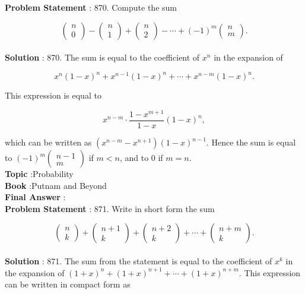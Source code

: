 \documentclass[10pt]{article}
\begin{document}
\textbf{Problem Statement} :
870. Compute the sum

$$
\left(\begin{array}{l}
n \\
0
\end{array}\right)-\left(\begin{array}{l}
n \\
1
\end{array}\right)+\left(\begin{array}{l}
n \\
2
\end{array}\right)-\cdots+(-1)^{m}\left(\begin{array}{l}
n \\
m
\end{array}\right) .
$$
\\
\textbf{Solution} :
870. The sum is equal to the coefficient of $x^{n}$ in the expansion of

$$
x^{n}(1-x)^{n}+x^{n-1}(1-x)^{n}+\cdots+x^{n-m}(1-x)^{n} .
$$

This expression is equal to

$$
x^{n-m} \cdot \frac{1-x^{m+1}}{1-x}(1-x)^{n},
$$

which can be written as $\left(x^{n-m}-x^{n+1}\right)(1-x)^{n-1}$. Hence the sum is equal to $(-1)^{m}\left(\begin{array}{c}n-1 \\ m\end{array}\right)$ if $m<n$, and to 0 if $m=n$.
\\
\textbf{Topic} :Probability\\
\textbf{Book} :Putnam and Beyond\\
\textbf{Final Answer} :\\


\textbf{Problem Statement} :
871. Write in short form the sum

$$
\left(\begin{array}{l}
n \\
k
\end{array}\right)+\left(\begin{array}{c}
n+1 \\
k
\end{array}\right)+\left(\begin{array}{c}
n+2 \\
k
\end{array}\right)+\cdots+\left(\begin{array}{c}
n+m \\
k
\end{array}\right) .
$$
\\
\textbf{Solution} :
871. The sum from the statement is equal to the coefficient of $x^{k}$ in the expansion of $(1+x)^{n}+(1+x)^{n+1}+\cdots+(1+x)^{n+m}$. This expression can be written in compact form as 
\end{document}
